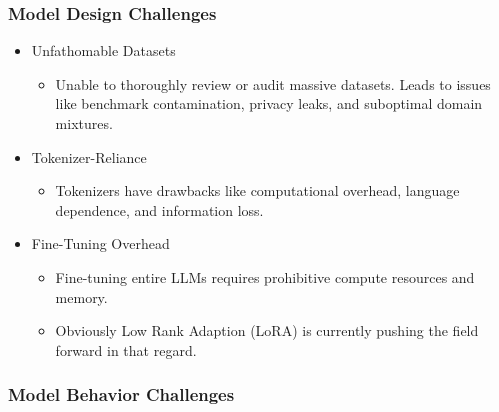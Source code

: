 \subsubsection{Model Design Challenges}

\begin{itemize}

\item Unfathomable Datasets
\begin{itemize}
\item Unable to thoroughly review or audit massive datasets. Leads to issues like benchmark contamination, privacy leaks, and suboptimal domain mixtures.

\end{itemize}

\item Tokenizer-Reliance
\begin{itemize}
\item Tokenizers have drawbacks like computational overhead, language dependence, and information loss.
\end{itemize}

\item Fine-Tuning Overhead
\begin{itemize}
\item Fine-tuning entire LLMs requires prohibitive compute resources and memory.
\item Obviously Low Rank Adaption (LoRA) is currently pushing the field forward in that regard.
\end{itemize}

\end{itemize}

\subsubsection{Model Behavior Challenges}

